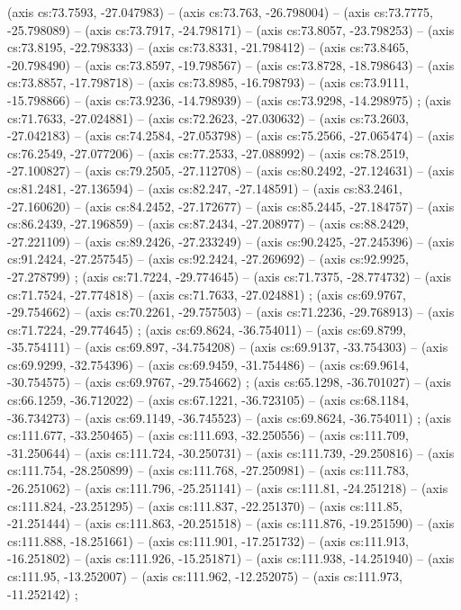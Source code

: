     (axis cs:73.7593,    -27.047983) --  (axis cs:73.763,    -26.798004) --  (axis cs:73.7775,    -25.798089) --  (axis cs:73.7917,    -24.798171) --  (axis cs:73.8057,    -23.798253) --  (axis cs:73.8195,    -22.798333) --  (axis cs:73.8331,    -21.798412) --  (axis cs:73.8465,    -20.798490) --  (axis cs:73.8597,    -19.798567) --  (axis cs:73.8728,    -18.798643) --  (axis cs:73.8857,    -17.798718) --  (axis cs:73.8985,    -16.798793) --  (axis cs:73.9111,    -15.798866) --  (axis cs:73.9236,    -14.798939) --  (axis cs:73.9298,    -14.298975) ;
    (axis cs:71.7633,    -27.024881) --  (axis cs:72.2623,    -27.030632) --  (axis cs:73.2603,    -27.042183) --  (axis cs:74.2584,    -27.053798) --  (axis cs:75.2566,    -27.065474) --  (axis cs:76.2549,    -27.077206) --  (axis cs:77.2533,    -27.088992) --  (axis cs:78.2519,    -27.100827) --  (axis cs:79.2505,    -27.112708) --  (axis cs:80.2492,    -27.124631) --  (axis cs:81.2481,    -27.136594) --  (axis cs:82.247,    -27.148591) --  (axis cs:83.2461,    -27.160620) --  (axis cs:84.2452,    -27.172677) --  (axis cs:85.2445,    -27.184757) --  (axis cs:86.2439,    -27.196859) --  (axis cs:87.2434,    -27.208977) --  (axis cs:88.2429,    -27.221109) --  (axis cs:89.2426,    -27.233249) --  (axis cs:90.2425,    -27.245396) --  (axis cs:91.2424,    -27.257545) --  (axis cs:92.2424,    -27.269692) --  (axis cs:92.9925,    -27.278799) ;
    (axis cs:71.7224,    -29.774645) --  (axis cs:71.7375,    -28.774732) --  (axis cs:71.7524,    -27.774818) --  (axis cs:71.7633,    -27.024881) ;
    (axis cs:69.9767,    -29.754662) --  (axis cs:70.2261,    -29.757503) --  (axis cs:71.2236,    -29.768913) --  (axis cs:71.7224,    -29.774645) ;
    (axis cs:69.8624,    -36.754011) --  (axis cs:69.8799,    -35.754111) --  (axis cs:69.897,    -34.754208) --  (axis cs:69.9137,    -33.754303) --  (axis cs:69.9299,    -32.754396) --  (axis cs:69.9459,    -31.754486) --  (axis cs:69.9614,    -30.754575) --  (axis cs:69.9767,    -29.754662) ;
    (axis cs:65.1298,    -36.701027) --  (axis cs:66.1259,    -36.712022) --  (axis cs:67.1221,    -36.723105) --  (axis cs:68.1184,    -36.734273) --  (axis cs:69.1149,    -36.745523) --  (axis cs:69.8624,    -36.754011) ;
    (axis cs:111.677,    -33.250465) --  (axis cs:111.693,    -32.250556) --  (axis cs:111.709,    -31.250644) --  (axis cs:111.724,    -30.250731) --  (axis cs:111.739,    -29.250816) --  (axis cs:111.754,    -28.250899) --  (axis cs:111.768,    -27.250981) --  (axis cs:111.783,    -26.251062) --  (axis cs:111.796,    -25.251141) --  (axis cs:111.81,    -24.251218) --  (axis cs:111.824,    -23.251295) --  (axis cs:111.837,    -22.251370) --  (axis cs:111.85,    -21.251444) --  (axis cs:111.863,    -20.251518) --  (axis cs:111.876,    -19.251590) --  (axis cs:111.888,    -18.251661) --  (axis cs:111.901,    -17.251732) --  (axis cs:111.913,    -16.251802) --  (axis cs:111.926,    -15.251871) --  (axis cs:111.938,    -14.251940) --  (axis cs:111.95,    -13.252007) --  (axis cs:111.962,    -12.252075) --  (axis cs:111.973,    -11.252142) ;
